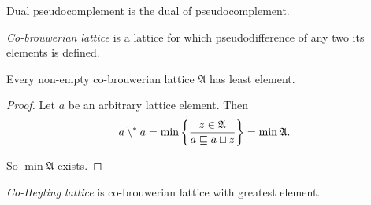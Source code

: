 \begin{obvious}
Dual pseudocomplement is the dual of pseudocomplement.\end{obvious}
\begin{defn}
\emph{Co-brouwerian lattice} is a lattice
for which pseudodifference of any two its elements is defined.\end{defn}
\begin{prop}
Every non-empty co-brouwerian lattice $\mathfrak{A}$ has least element.\end{prop}
\begin{proof}
Let $a$ be an arbitrary lattice element. Then
\[
a\setminus^{\ast} a=\min\left\{ \frac{z\in\mathfrak{A}}{a\sqsubseteq a\sqcup z}\right\}=\min\mathfrak{A}.
\]


So $\min\mathfrak{A}$ exists.\end{proof}
\begin{defn}
\emph{Co-Heyting lattice} is co-brouwerian
lattice with greatest element.
\end{defn}

